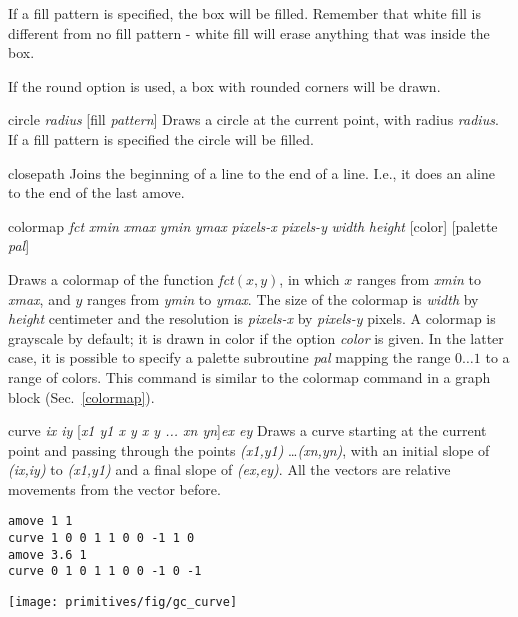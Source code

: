 \begin{commanddescription}
If a fill pattern is specified, the box will be filled.
Remember that white fill is different from no fill pattern - white fill will
erase anything that was inside the box.

If the {\sf round} option is used, a box with rounded corners will be drawn.

\item[{\sf circle {\it radius} [fill {\it pattern}]} ]
  Draws a circle at the current point,
with radius {\it radius}.  If a fill
pattern is specified the circle will be filled.

\item[{\sf closepath }]
Joins the beginning of a line to the end of a line. I.e., it does an {\sf aline}
to the end of the last {\sf amove}.

\item[{\sf colormap {\it fct} {\it xmin} {\it xmax} {\it ymin} {\it ymax} {\it pixels-x} {\it pixels-y} {\it width} {\it height} [color] [palette {\it pal}]}]

Draws a colormap of the function {\it fct}$(x,y)$, in which $x$ ranges from {\it xmin} to {\it xmax}, and $y$ ranges from {\it ymin} to {\it ymax}. The size of the colormap is {\it width} by {\it height} centimeter and the resolution is {\it pixels-x} by {\it pixels-y} pixels. A colormap is grayscale by default; it is drawn in color if the option {\it color} is given. In the latter case, it is possible to specify a palette subroutine {\it pal} mapping the range $0 \ldots 1$ to a range of colors. This command is similar to the colormap command in a graph block (Sec.~\ref{colormap}).

\item[{\sf curve {\it ix iy }[{\it x1 y1 x y x y ... xn yn}]{\it ex ey }}  ]
 Draws a curve starting at the current point and passing through the points
{\it (x1,y1)} \ldots {\it (xn,yn)}, with an initial slope of {\it (ix,iy)} to
{\it (x1,y1)} and a final slope of {\it (ex,ey)}. All the vectors are
relative movements from the vector before.

\begin{minipage}[c]{8cm}
\begin{Verbatim}
amove 1 1 
curve 1 0 0 1 1 0 0 -1 1 0 
amove 3.6 1 
curve 0 1 0 1 1 0 0 -1 0 -1 
\end{Verbatim}
\end{minipage}
\hfill
\begin{minipage}[c]{7cm}
\mbox{\texttt{[image: primitives/fig/gc\_curve]}}
\end{minipage}


\end{commanddescription}
